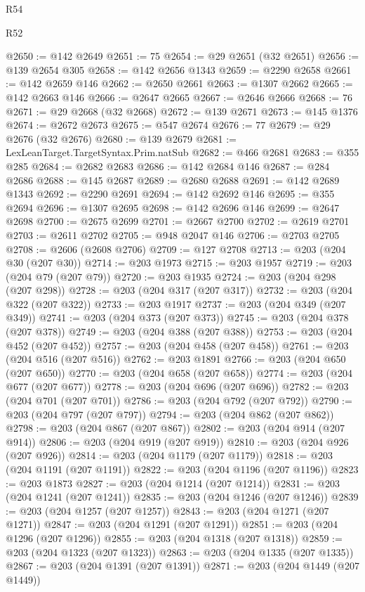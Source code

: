 \begin{lexlean}{R54}
\begin{lexlean}{R52}
\begin{coremodule}
{{{{{{{{{{{{{{{{{{{{{{{{{{{{{{{{{{{{{{{{{{{{{{{{{{{{{{{{{{{{{{{{{{{{{{{{{{{{{{{{{{{{{{{{{{{{{{{{{{{{{{{{{{{{{{{{{{{{{{{{{{{{{{{{{{{{{{{{{{{{{{{{{{{{{{{{{{{{{{{{{{{{{{{{{{{{{{{{{{{{{{{{{{{{{{{{{{{{{{@2650 := @142 @2649
@2651 := 75
@2654 := @29 @2651 (@32 @2651)
@2656 := @139 @2654 @305
@2658 := @142 @2656 @1343
@2659 := @2290 @2658
@2661 := @142 @2659 @146
@2662 := @2650 @2661
@2663 := @1307 @2662
@2665 := @142 @2663 @146
@2666 := @2647 @2665
@2667 := @2646 @2666
@2668 := 76
@2671 := @29 @2668 (@32 @2668)
@2672 := @139 @2671
@2673 := @145 @1376
@2674 := @2672 @2673
@2675 := @547 @2674
@2676 := 77
@2679 := @29 @2676 (@32 @2676)
@2680 := @139 @2679
@2681 := LexLeanTarget.TargetSyntax.Prim.natSub
@2682 := @466 @2681
@2683 := @355 @285
@2684 := @2682 @2683
@2686 := @142 @2684 @146
@2687 := @284 @2686
@2688 := @145 @2687
@2689 := @2680 @2688
@2691 := @142 @2689 @1343
@2692 := @2290 @2691
@2694 := @142 @2692 @146
@2695 := @355 @2694
@2696 := @1307 @2695
@2698 := @142 @2696 @146
@2699 := @2647 @2698
@2700 := @2675 @2699
@2701 := @2667 @2700
@2702 := @2619 @2701
@2703 := @2611 @2702
@2705 := @948 @2047 @146
@2706 := @2703 @2705
@2708 := @2606 (@2608 @2706)
@2709 := @127 @2708
@2713 := @203 (@204 @30 (@207 @30))
@2714 := @203 @1973
@2715 := @203 @1957
@2719 := @203 (@204 @79 (@207 @79))
@2720 := @203 @1935
@2724 := @203 (@204 @298 (@207 @298))
@2728 := @203 (@204 @317 (@207 @317))
@2732 := @203 (@204 @322 (@207 @322))
@2733 := @203 @1917
@2737 := @203 (@204 @349 (@207 @349))
@2741 := @203 (@204 @373 (@207 @373))
@2745 := @203 (@204 @378 (@207 @378))
@2749 := @203 (@204 @388 (@207 @388))
@2753 := @203 (@204 @452 (@207 @452))
@2757 := @203 (@204 @458 (@207 @458))
@2761 := @203 (@204 @516 (@207 @516))
@2762 := @203 @1891
@2766 := @203 (@204 @650 (@207 @650))
@2770 := @203 (@204 @658 (@207 @658))
@2774 := @203 (@204 @677 (@207 @677))
@2778 := @203 (@204 @696 (@207 @696))
@2782 := @203 (@204 @701 (@207 @701))
@2786 := @203 (@204 @792 (@207 @792))
@2790 := @203 (@204 @797 (@207 @797))
@2794 := @203 (@204 @862 (@207 @862))
@2798 := @203 (@204 @867 (@207 @867))
@2802 := @203 (@204 @914 (@207 @914))
@2806 := @203 (@204 @919 (@207 @919))
@2810 := @203 (@204 @926 (@207 @926))
@2814 := @203 (@204 @1179 (@207 @1179))
@2818 := @203 (@204 @1191 (@207 @1191))
@2822 := @203 (@204 @1196 (@207 @1196))
@2823 := @203 @1873
@2827 := @203 (@204 @1214 (@207 @1214))
@2831 := @203 (@204 @1241 (@207 @1241))
@2835 := @203 (@204 @1246 (@207 @1246))
@2839 := @203 (@204 @1257 (@207 @1257))
@2843 := @203 (@204 @1271 (@207 @1271))
@2847 := @203 (@204 @1291 (@207 @1291))
@2851 := @203 (@204 @1296 (@207 @1296))
@2855 := @203 (@204 @1318 (@207 @1318))
@2859 := @203 (@204 @1323 (@207 @1323))
@2863 := @203 (@204 @1335 (@207 @1335))
@2867 := @203 (@204 @1391 (@207 @1391))
@2871 := @203 (@204 @1449 (@207 @1449))
}}}}}}}}}}}}}}}}}}}}}}}}}}}}}}}}}}}}}}}}}}}}}}}}}}}}}}}}}}}}}}}}}}}}}}}}}}}}}}}}}}}}}}}}}}}}}}}}}}}}}}}}}}}}}}}}}}}}}}}}}}}}}}}}}}}}}}}}}}}}}}}}}}}}}}}}}}}}}}}}}}}}}}}}}}}}}}}}}}}}}}}}}}}}}}}}}}}}}}
\end{coremodule}
\end{lexlean}
\end{lexlean}
